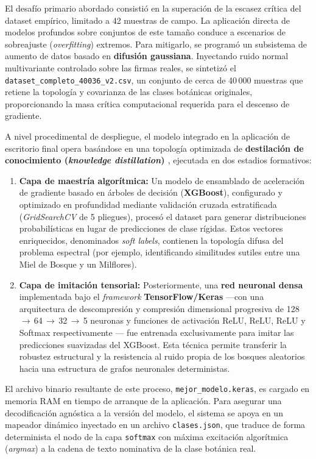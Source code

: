 El desafío primario abordado consistió en la superación de la escasez crítica del dataset empírico, limitado a 42 muestras de campo. La aplicación directa de modelos profundos sobre conjuntos de este tamaño conduce a escenarios de sobreajuste (\textit{overfitting}) extremos. Para mitigarlo, se programó un subsistema de aumento de datos basado en \textbf{difusión gaussiana}. Inyectando ruido normal multivariante controlado sobre las firmas reales, se sintetizó el \texttt{dataset\_completo\_40036\_v2.csv}, un conjunto de cerca de 40\,000 muestras que retiene la topología y covarianza de las clases botánicas originales, proporcionando la masa crítica computacional requerida para el descenso de gradiente.

A nivel procedimental de despliegue, el modelo integrado en la aplicación de escritorio final opera basándose en una topología optimizada de \textbf{destilación de conocimiento (\textit{knowledge distillation}) \cite{hinton2015distilling}}, ejecutada en dos estadios formativos:

\begin{enumerate}
    \item \textbf{Capa de maestría algorítmica:} Un modelo de ensamblado de aceleración de gradiente basado en árboles de decisión (\textbf{XGBoost\cite{chen2016xgboost}}), configurado y optimizado en profundidad mediante validación cruzada estratificada (\textit{GridSearchCV} de 5 pliegues), procesó el dataset para generar distribuciones probabilísticas en lugar de predicciones de clase rígidas. Estos vectores enriquecidos, denominados \textit{soft labels}, contienen la topología difusa del problema espectral (por ejemplo, identificando similitudes sutiles entre una Miel de Bosque y un Milflores).
    \item \textbf{Capa de imitación tensorial:} Posteriormente, una \textbf{red neuronal densa} implementada bajo el \textit{framework} \textbf{TensorFlow/Keras} ---con una arquitectura de descompresión y compresión dimensional progresiva de 128\,$\rightarrow$\,64\,$\rightarrow$\,32\,$\rightarrow$\,5 neuronas y funciones de activación ReLU, ReLU, ReLU y Softmax respectivamente --- fue entrenada exclusivamente para imitar las predicciones suavizadas del XGBoost. Esta técnica permite transferir la robustez estructural y la resistencia al ruido propia de los bosques aleatorios hacia una estructura de grafos neuronales deterministas.
\end{enumerate}

El archivo binario resultante de este proceso, \texttt{mejor\_modelo.keras}, es cargado en memoria RAM en tiempo de arranque de la aplicación. Para asegurar una decodificación agnóstica a la versión del modelo, el sistema se apoya en un mapeador dinámico inyectado en un archivo \texttt{clases.json}, que traduce de forma determinista el nodo de la capa \texttt{softmax} con máxima excitación algorítmica (\textit{argmax\cite{goodfellow2016deeplearning}}) a la cadena de texto nominativa de la clase botánica real.

